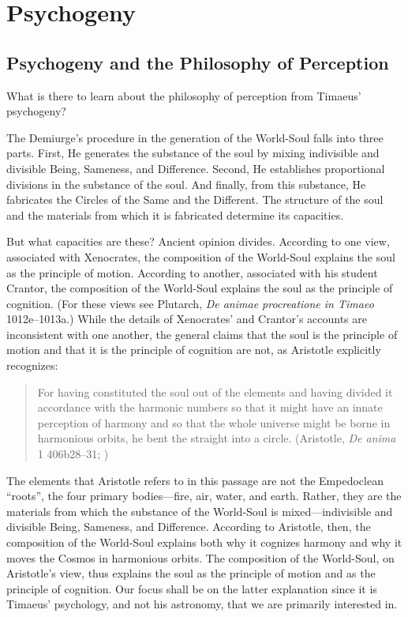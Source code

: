 
\chapter{Psychogeny} %
\label{cha:psychogeny}

\section{Psychogeny and the Philosophy of Perception} %
\label{sec:psychogeny_and_the_philosophy_of_perception}

What is there to learn about the philosophy of perception from Timaeus' psychogeny? 

The Demiurge's procedure in the generation of the World-Soul falls into three parts. First, He generates the substance of the soul by mixing indivisible and divisible Being, Sameness, and Difference. Second, He establishes proportional divisions in the substance of the soul. And finally, from this substance, He fabricates the Circles of the Same and the Different. The structure of the soul and the materials from which it is fabricated determine its capacities. 

But what capacities are these? Ancient opinion divides. According to one view, associated with Xenocrates, the composition of the World-Soul explains the soul as the principle of motion. According to another, associated with his student Crantor, the composition of the World-Soul explains the soul as the principle of cognition. (For these views see Plutarch, \emph{De animae procreatione in Timaeo} 1012e--1013a.) While the details of Xenocrates' and Crantor's accounts are inconsistent with one another, the general claims that the soul is the principle of motion and that it is the principle of cognition are not, as Aristotle explicitly recognizes:
\begin{quote}
	For having constituted the soul out of the elements and having divided it accordance with the harmonic numbers so that it might have an innate perception of harmony and so that the whole universe might be borne in harmonious orbits, he bent the straight into a circle. (Aristotle, \emph{De anima} 1 406b28--31; \citealt[10]{Shields:2016ix})
\end{quote}
The elements that Aristotle refers to in this passage are not the Empedoclean ``roots'', the four primary bodies---fire, air, water, and earth. Rather, they are the materials from which the substance of the World-Soul is mixed---indivisible and divisible Being, Sameness, and Difference. According to Aristotle, then, the composition of the World-Soul explains both why it cognizes harmony and why it moves the Cosmos in harmonious orbits. The composition of the World-Soul, on Aristotle's view, thus explains the soul as the principle of motion and as the principle of cognition. Our focus shall be on the latter explanation since it is Timaeus' psychology, and not his astronomy, that we are primarily interested in.

